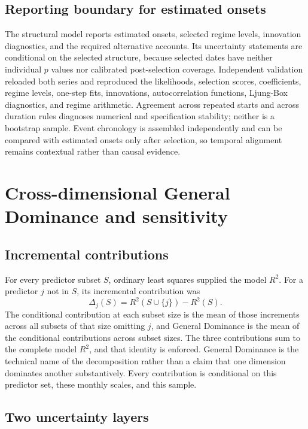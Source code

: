 \subsection*{Reporting boundary for estimated onsets}

The structural model reports estimated onsets, selected regime levels, innovation diagnostics, and the required alternative accounts. Its uncertainty statements are conditional on the selected structure, because selected dates have neither individual $p$ values nor calibrated post-selection coverage. Independent validation reloaded both series and reproduced the likelihoods, selection scores, coefficients, regime levels, one-step fits, innovations, autocorrelation functions, Ljung-Box diagnostics, and regime arithmetic. Agreement across repeated starts and across duration rules diagnoses numerical and specification stability; neither is a bootstrap sample. Event chronology is assembled independently and can be compared with estimated onsets only after selection, so temporal alignment remains contextual rather than causal evidence.

\section{Cross-dimensional General Dominance and sensitivity}

\subsection*{Incremental contributions}

For every predictor subset $S$, ordinary least squares supplied the model $R^{2}$. For a predictor $j$ not in $S$, its incremental contribution was
\[
\Delta_j(S)=R^{2}(S\cup\{j\})-R^{2}(S).
\]
The conditional contribution at each subset size is the mean of those increments across all subsets of that size omitting $j$, and General Dominance is the mean of the conditional contributions across subset sizes. The three contributions sum to the complete model $R^{2}$, and that identity is enforced. General Dominance is the technical name of the decomposition rather than a claim that one dimension dominates another substantively. Every contribution is conditional on this predictor set, these monthly scales, and this sample.

\subsection*{Two uncertainty layers}

